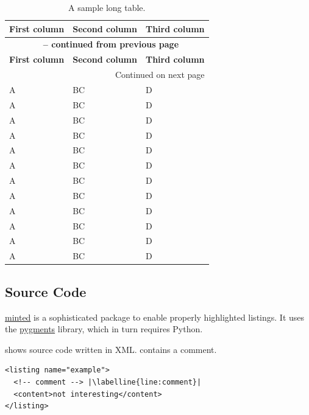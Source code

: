 \begin{ltgexample}
\begin{longtable}{|l|l|l|}
  \caption{A sample long table.}\label{tab:long} \\
  \hline
  \multicolumn{1}{|c|}{\textbf{First column}} & \multicolumn{1}{c|}{\textbf{Second column}} & \multicolumn{1}{c|}{\textbf{Third column}} \\ \hline
  \endfirsthead

  \multicolumn{3}{c}{{\bfseries \tablename\ \thetable{} -- continued from previous page}} \\
  \hline
  \multicolumn{1}{|c|}{\textbf{First column}} & \multicolumn{1}{c|}{\textbf{Second column}} & \multicolumn{1}{c|}{\textbf{Third column}} \\ \hline
  \endhead

  \hline \multicolumn{3}{|r|}{{Continued on next page}} \\ \hline
  \endfoot

  \hline\hline
  \endlastfoot

  A & BC & D \\
  A & BC & D \\
  A & BC & D \\
  A & BC & D \\
  A & BC & D \\
  A & BC & D \\
  A & BC & D \\
  A & BC & D \\
  A & BC & D \\
  A & BC & D \\
  A & BC & D \\
  A & BC & D \\
\end{longtable}
\end{ltgexample}

\subsection{Source Code}

\href{https://github.com/gpoore/minted}{minted} is a sophisticated package to enable properly highlighted listings.
It uses the \href{http://pygments.org/}{pygments} library, which in turn requires Python.

\begin{ltgexample}
 shows source code written in XML.
 contains a comment.

\begin{listing}[htbp]
  \begin{verbatim}
<listing name="example">
  <!-- comment --> |\labelline{line:comment}|
  <content>not interesting</content>
</listing>
\end{verbatim}
  \caption{Example XML listing using minted}
  \label{lst:XML}
\end{listing}
\end{ltgexample}

